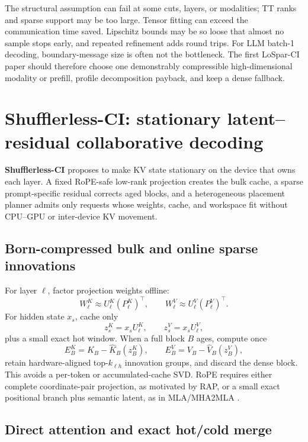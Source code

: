 \documentclass[10pt]{article}
\begin{document}
\begin{riskbox}[title={Possible limitations}]
The structural assumption can fail at some cuts, layers, or modalities; TT ranks and sparse
support may be too large. Tensor fitting can exceed the communication time saved. Lipschitz bounds
may be so loose that almost no sample stops early, and repeated refinement adds round trips.
For LLM batch-1 decoding, boundary-message size is often not the bottleneck. The first LoSpar-CI
paper should therefore choose one demonstrably compressible high-dimensional modality or prefill,
profile decomposition payback, and keep a dense fallback.
\end{riskbox}

\section{Shufflerless-CI: stationary latent--residual collaborative decoding}

\begin{methodbox}[title={Proposed systems co-design}]
\textbf{Shufflerless-CI} proposes to make KV state stationary on the device that owns each layer.
A fixed RoPE-safe low-rank projection creates the bulk cache, a sparse prompt-specific residual
corrects aged blocks, and a heterogeneous placement planner admits only requests whose weights,
cache, and workspace fit without CPU--GPU or inter-device KV movement.
\end{methodbox}

\subsection{Born-compressed bulk and online sparse innovations}

For layer $\ell$, factor projection weights offline:
\[
W^K_\ell\approx U^K_\ell(P^K_\ell)^\top,\qquad
W^V_\ell\approx U^V_\ell(P^V_\ell)^\top .
\]
For hidden state $x_s$, cache only
\[
z^K_s=x_sU^K_\ell,\qquad z^V_s=x_sU^V_\ell ,
\]
plus a small exact hot window. When a full block $B$ ages, compute once
\[
E_B^K=K_B-\widehat K_B(z_B^K),\qquad
E_B^V=V_B-\widehat V_B(z_B^V),
\]
retain hardware-aligned top-$k_{\ell h}$ innovation groups, and discard the dense block. This
avoids a per-token or accumulated-cache SVD. RoPE requires either complete coordinate-pair
projection, as motivated by RAP, or a small exact positional branch plus semantic latent, as in
MLA/MHA2MLA \cite{rap,mha2mla,mla}.

\subsection{Direct attention and exact hot/cold merge}
\end{document}
